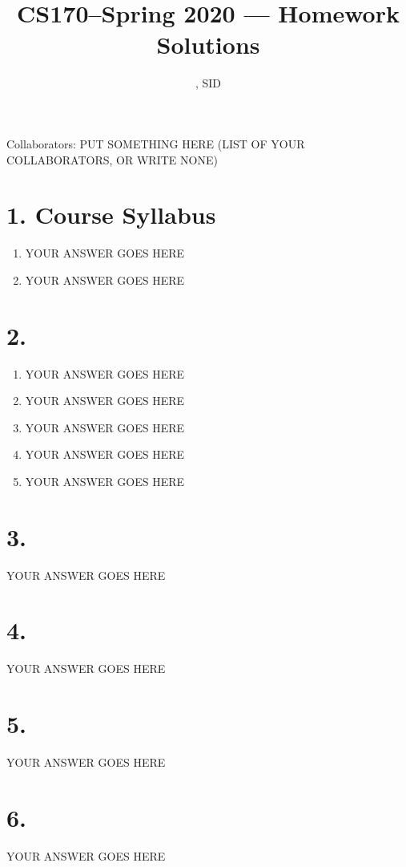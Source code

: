 \documentclass[11pt]{article}
\title{CS170--Spring 2020 --- Homework \Homework Solutions}
\author{\Name, SID \SID}
\date{}
\newenvironment{qparts}{\begin{enumerate}[{(}a{)}]}{\end{enumerate}}
\begin{document}
\maketitle

Collaborators: PUT SOMETHING HERE (LIST OF YOUR COLLABORATORS, OR WRITE NONE)

\section*{1. Course Syllabus}
\begin{qparts}
\item
YOUR ANSWER GOES HERE

\item
YOUR ANSWER GOES HERE

\end{qparts}



\newpage
\section*{2.}
\begin{qparts}
\item
YOUR ANSWER GOES HERE

\item
YOUR ANSWER GOES HERE

\item
YOUR ANSWER GOES HERE

\item
YOUR ANSWER GOES HERE

\item
YOUR ANSWER GOES HERE

\end{qparts}


\newpage
\section*{3.}
YOUR ANSWER GOES HERE


\newpage
\section*{4.}
YOUR ANSWER GOES HERE


\newpage
\section*{5.}
YOUR ANSWER GOES HERE


\newpage
\section*{6.}
YOUR ANSWER GOES HERE
\end{document}
